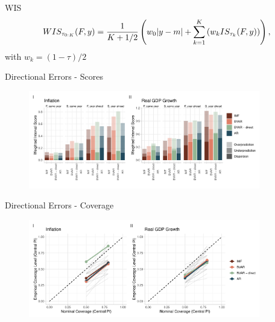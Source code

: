 \documentclass[en]{sdqbeamer}
\begin{document}
\appendix
\beginbackup
\begin{frame}{WIS}
\begin{equation}
WIS_{\tau_{0:K}}(F,y) = \frac{1}{K + 1/2}\left(w_{0}|y-m| + \sum_{k=1}^{K}\left(w_k IS_{\tau_{k}}(F, y)\right)\right), 
\vspace*{5.5mm}
\end{equation}
\hspace*{3cm} with $w_k = (1-\tau)/2$
\end{frame}
\begin{frame}{Directional Errors - Scores}
\label{errorextraction}
\begin{figure}
        \centering
        \includegraphics[width=0.9\textwidth]{figures/wis_cpigdp_directional.pdf}
    \end{figure}
\end{frame}
\begin{frame}{Directional Errors - Coverage}
\begin{figure}
        \centering
        \includegraphics[width=0.9\textwidth]{figures/coverage_directional.pdf}
    \end{figure}
\end{frame}
\end{document}
